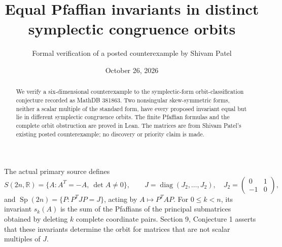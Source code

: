 \documentclass[11pt]{article}
\title{Equal Pfaffian invariants in distinct symplectic congruence orbits}
\author{Formal verification of a posted counterexample by Shivam Patel}
\date{October 26, 2026}
\begin{document}
\maketitle
\begin{abstract}
We verify a six-dimensional counterexample to the symplectic-form orbit-classification conjecture recorded as MathDB 381863. Two nonsingular skew-symmetric forms, neither a scalar multiple of the standard form, have every proposed invariant equal but lie in different symplectic congruence orbits. The finite Pfaffian formulas and the complete orbit obstruction are proved in Lean. The matrices are from Shivam Patel's existing posted counterexample; no discovery or priority claim is made.
\end{abstract}
The actual primary source defines
\[
 S(2n,\mathbb R)=\{A:A^T=-A,\ \det A\ne0\},\qquad
 J=\operatorname{diag}(J_2,\ldots,J_2),\quad
 J_2=\begin{pmatrix}0&1\\-1&0\end{pmatrix},
\]
and $\operatorname{Sp}(2n)=\{P:P^TJP=J\}$, acting by $A\mapsto P^TAP$. For $0\le k<n$, its invariant $s_k(A)$ is the sum of the Pfaffians of the principal submatrices obtained by deleting $k$ complete coordinate pairs. Section 9, Conjecture 1 asserts that these invariants determine the orbit for matrices that are not scalar multiples of $J$.
\end{document}
